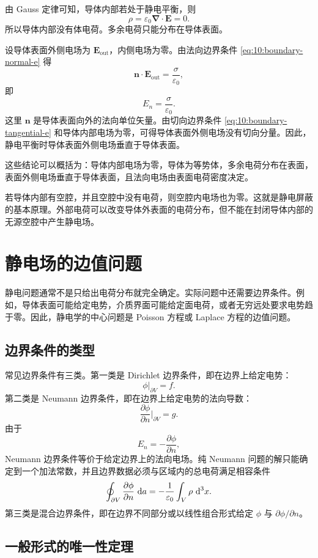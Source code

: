 由 Gauss 定律可知，导体内部若处于静电平衡，则
\[
\rho
=
\varepsilon_{0}\bm{\nabla}\cdot\bm{E}
=
0.
\]
所以导体内部没有体电荷。多余电荷只能分布在导体表面。

设导体表面外侧电场为 $\bm{E}_{\mathrm{out}}$，内侧电场为零。由法向边界条件 \eqref{eq:10:boundary-normal-e} 得
\[
\bm{n}\cdot\bm{E}_{\mathrm{out}}
=
\frac{\sigma}{\varepsilon_{0}},
\]
即
\begin{equation}
	E_{n}
	=
	\frac{\sigma}{\varepsilon_{0}}.
	\label{eq:10:conductor-surface-field}
\end{equation}
这里 $\bm{n}$ 是导体表面向外的法向单位矢量。由切向边界条件 \eqref{eq:10:boundary-tangential-e} 和导体内部电场为零，可得导体表面外侧电场没有切向分量。因此，静电平衡时导体表面外侧电场垂直于导体表面。

这些结论可以概括为：导体内部电场为零，导体为等势体，多余电荷分布在表面，表面外侧电场垂直于导体表面，且法向电场由表面电荷密度决定。

若导体内部有空腔，并且空腔中没有电荷，则空腔内电场也为零。这就是静电屏蔽的基本原理。外部电荷可以改变导体外表面的电荷分布，但不能在封闭导体内部的无源空腔中产生静电场。

\section{静电场的边值问题}

静电问题通常不是只给出电荷分布就完全确定。实际问题中还需要边界条件。例如，导体表面可能给定电势，介质界面可能给定面电荷，或者无穷远处要求电势趋于零。因此，静电学的中心问题是 Poisson 方程或 Laplace 方程的边值问题。

\subsection{边界条件的类型}

常见边界条件有三类。第一类是 Dirichlet 边界条件，即在边界上给定电势：
\[
\phi|_{\partial V}
=
f.
\]
第二类是 Neumann 边界条件，即在边界上给定电势的法向导数：
\[
\frac{\partial\phi}{\partial n}\bigg|_{\partial V}
=
g.
\]
由于
\[
E_{n}
=
-\frac{\partial\phi}{\partial n},
\]
Neumann 边界条件等价于给定边界上的法向电场。纯 Neumann 问题的解只能确定到一个加法常数，并且边界数据必须与区域内的总电荷满足相容条件
\[
\oint_{\partial V}
\frac{\partial\phi}{\partial n}\,\mathop{}\!\mathrm{d} a
=
-\frac{1}{\varepsilon_{0}}
\int_{V}\rho\,\mathop{}\!\mathrm{d}^{3}x.
\]
第三类是混合边界条件，即在边界不同部分或以线性组合形式给定 $\phi$ 与 $\partial\phi/\partial n$。

\subsection{一般形式的唯一性定理}

